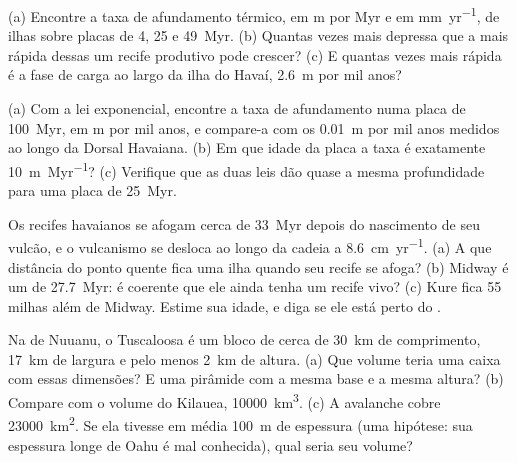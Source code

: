 \begin{exercise}[$\star\star$]\label{exo:b2:oceanic-islands:5}
(a) Encontre a taxa de afundamento térmico, em \unit{m} por \unit{Myr} e em \unit{mm.yr^{-1}}, de
ilhas sobre placas de 4, 25 e \qty{49}{Myr}. (b) Quantas vezes mais depressa que a mais rápida dessas
um recife produtivo pode crescer? (c) E quantas vezes mais rápida é a fase de carga ao largo da ilha do
Havaí, \qty{2.6}{m} por mil anos?
\end{exercise}

\begin{exercise}[$\star\star$]\label{exo:b2:oceanic-islands:6}
(a) Com a lei exponencial, encontre a taxa de afundamento numa placa de \qty{100}{Myr}, em \unit{m}
por mil anos, e compare-a com os \qty{0.01}{m} por mil anos medidos ao longo da
Dorsal Havaiana. (b) Em que idade da placa a taxa é exatamente \qty{10}{m.Myr^{-1}}? (c) Verifique que as
duas leis dão quase a mesma profundidade para uma placa de \qty{25}{Myr}.
\end{exercise}

\begin{exercise}[$\star\star$]\label{exo:b2:oceanic-islands:7}
Os recifes havaianos se afogam cerca de \qty{33}{Myr} depois do nascimento de seu vulcão, e o vulcanismo se desloca
ao longo da cadeia a \qty{8.6}{cm.yr^{-1}}. (a) A que distância do ponto quente fica uma ilha quando seu
recife se afoga? (b) Midway é um  de \qty{27.7}{Myr}: é coerente que ele ainda tenha um
recife vivo? (c) Kure fica 55 milhas além de Midway. Estime sua idade, e diga se ele está perto
do .
\end{exercise}

\begin{exercise}[$\star\star$]\label{exo:b2:oceanic-islands:8}
Na  de Nuuanu, o  Tuscaloosa é um bloco de cerca de \qty{30}{km} de comprimento,
\qty{17}{km} de largura e pelo menos \qty{2}{km} de altura. (a) Que volume teria uma caixa com essas dimensões?
E uma pirâmide com a mesma base e a mesma altura? (b) Compare com o volume do
Kilauea, \qty{10000}{km^3}. (c) A avalanche cobre \qty{23000}{km^2}. Se ela tivesse em média
\qty{100}{m} de espessura (uma hipótese: sua espessura longe de Oahu é mal conhecida), qual seria seu
volume?
\end{exercise}

